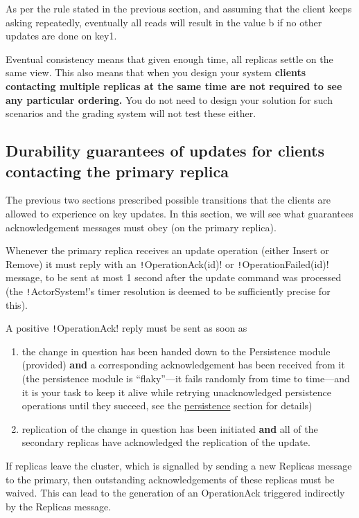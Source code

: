 \documentclass{article}
\begin{document}
As per the rule stated in the previous section, and assuming that the client keeps asking repeatedly, eventually all reads will result in the value b if no other updates are done on key1.

Eventual consistency means that given enough time, all replicas settle on the same view. This also means that when you design your system \textbf{clients contacting multiple replicas at the same time are not required to see any particular ordering.} You do not need to design your solution for such scenarios and the grading system will not test these either.

\subsection{Durability guarantees of updates for clients contacting the primary replica}

The previous two sections prescribed possible transitions that the clients are allowed to experience on key updates. In this section, we will see what guarantees acknowledgement messages must obey (on the primary replica).

Whenever the primary replica receives an update operation (either Insert or Remove) it must reply with an \texttt!OperationAck(id)! or \texttt!OperationFailed(id)! message, to be sent at most 1 second after the update command was processed (the \texttt!ActorSystem!’s timer resolution is deemed to be sufficiently precise for this).

A positive \texttt!OperationAck! reply must be sent as soon as

\begin{enumerate}
	\item the change in question has been handed down to the Persistence module (provided) \textbf{and} a corresponding acknowledgement has been received from it (the persistence module is ``flaky''—it fails randomly from time to time—and it is your task to keep it alive while retrying unacknowledged persistence operations until they succeed, see the \hyperref[ss:persistence]{persistence} section for details)
	\item replication of the change in question has been initiated \textbf{and} all of the secondary replicas have acknowledged the replication of the update.
\end{enumerate}

If replicas leave the cluster, which is signalled by sending a new Replicas message to the primary, then outstanding acknowledgements of these replicas must be waived. This can lead to the generation of an OperationAck triggered indirectly by the Replicas message.
\end{document}
